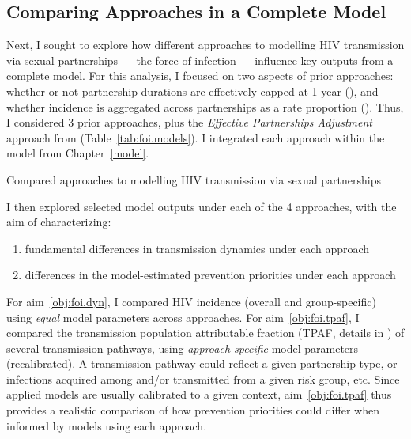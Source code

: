 \subsection{Comparing Approaches in a Complete Model}\label{foi.exp.model}
Next, I sought to explore how different approaches to
modelling HIV transmission via sexual partnerships --- \ie the force of infection ---
influence key outputs from a complete model.
For this analysis, I focused on two aspects of prior approaches:
whether or not partnership durations are effectively capped at 1 year (), and
whether incidence is aggregated across partnerships as a rate \vs proportion ().
Thus, I considered 3 prior approaches,
plus the \emph{Effective Partnerships Adjustment} approach from 
(Table~\ref{tab:foi.models}).
I integrated each approach within the model from Chapter~\ref{model}.
\begin{table}[h]
  \centering
  \caption{Compared approaches to modelling HIV transmission via sexual partnerships}
  \label{tab:foi.models}
  
\end{table}
\par
I then explored selected model outputs under each of the 4 approaches,
with the aim of characterizing:
\begin{enumerate}
  \item \label{obj:foi.dyn}
  fundamental differences in transmission dynamics under each approach
  \item \label{obj:foi.tpaf}
  differences in the model-estimated prevention priorities under each approach
\end{enumerate}
For aim~\ref{obj:foi.dyn}, I compared HIV incidence (overall and group-specific)
using \emph{equal} model parameters across approaches.
For aim~\ref{obj:foi.tpaf}, I compared
the transmission population attributable fraction (TPAF, details in )
of several transmission pathways,
using \emph{approach-specific} model parameters (recalibrated).
A transmission pathway could reflect a given partnership type,
or infections acquired among and/or transmitted from a given risk group, etc.
Since applied models are usually calibrated to a given context,
aim~\ref{obj:foi.tpaf} thus provides a realistic comparison of
how prevention priorities could differ when informed by models using each approach.
